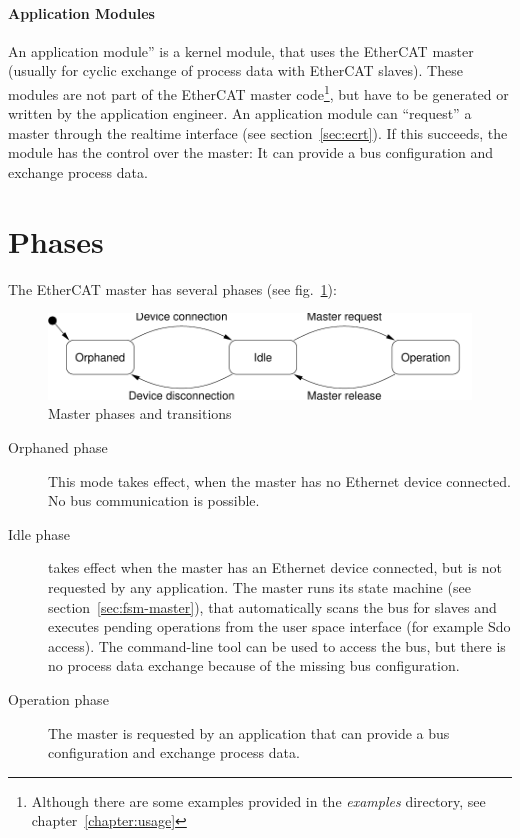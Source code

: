 \documentclass[a4paper,12pt,BCOR6mm,bibtotoc,idxtotoc]{scrbook}
\begin{document}
\paragraph{Application Modules}

An application module'' is a kernel module, that
uses the EtherCAT master (usually for cyclic exchange of process data with
EtherCAT slaves). These modules are not part of the EtherCAT master
code\footnote{Although there are some examples provided in the
\textit{examples} directory, see chapter~\ref{chapter:usage}}, but have to be
generated or written by the application engineer. An application module can
``request'' a master through the realtime interface (see
section~\ref{sec:ecrt}). If this succeeds, the module has the control over the
master: It can provide a bus configuration and exchange process data.


\section{Phases}

The EtherCAT master has several phases (see fig.~\ref{fig:phases}):

\begin{figure}[htbp]
  \centering
  \includegraphics[width=.9\textwidth]{images/phases}
  \caption{Master phases and transitions}
  \label{fig:phases}
\end{figure}
\begin{description}

\item[Orphaned phase] This mode takes effect, when the
master has no Ethernet device connected. No bus communication is possible.

\item[Idle phase] takes effect when the master has an
Ethernet device connected, but is not requested by any application. The master
runs its state machine (see section~\ref{sec:fsm-master}), that automatically
scans the bus for slaves and executes pending operations from the user space
interface (for example Sdo access). The command-line tool can be used to access
the bus, but there is no process data exchange because of the missing bus
configuration.

\item[Operation phase] The master is requested by an
application that can provide a bus configuration and exchange process data.

\end{description}
\end{document}

